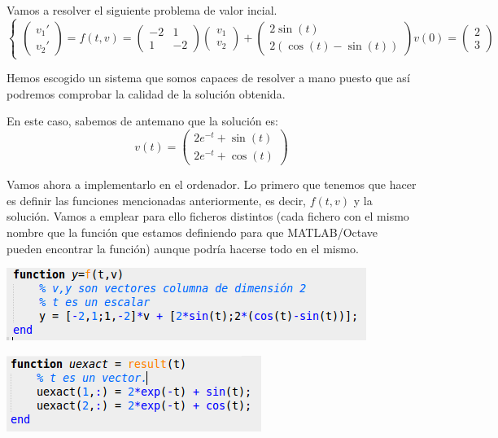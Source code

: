 \documentclass{apuntes}
\begin{document}
Vamos a resolver el siguiente problema de valor incial.
\[\left\{\begin{array}{l}
\left( \begin{array}{c}
v_1' \\
v_2'  \end{array} \right)=f(t,v) =\left( \begin{array}{cc}
-2 & 1 \\
1 & -2 \end{array} \right)\left( \begin{array}{c}
v_1 \\
v_2 \end{array} \right) + \left( \begin{array}{c}
2\sin(t) \\
2(\cos(t)-\sin(t))  \end{array} \right)
v(0) = \left( \begin{array}{c}
2 \\
3  \end{array} \right)\end{array}\right.\]

Hemos escogido un sistema que somos capaces de resolver a mano puesto que así podremos comprobar la calidad de la solución obtenida.

En este caso, sabemos de antemano que la solución es:
\[v(t)=\left( \begin{array}{c}
2e^{-t}+\sin(t) \\
2e^{-t}+\cos(t)  \end{array} \right)\]

Vamos ahora a implementarlo en el ordenador. Lo primero que tenemos que hacer es definir las funciones mencionadas anteriormente, es decir, $f(t,v)$ y la solución. Vamos a emplear para ello ficheros distintos (cada fichero con el mismo nombre que la función que estamos definiendo para que MATLAB/Octave pueden encontrar la función) aunque podría hacerse todo en el mismo.

\begin{center}
    \begin{minipage}{0.55\textwidth}
        \centering
        \includegraphics[width=\textwidth]{img/f.png}
    \end{minipage}
    \begin{minipage}{.4\textwidth}
        \centering
        \includegraphics[width=\textwidth]{img/result.png}
    \end{minipage}
\end{center}
\end{document}
